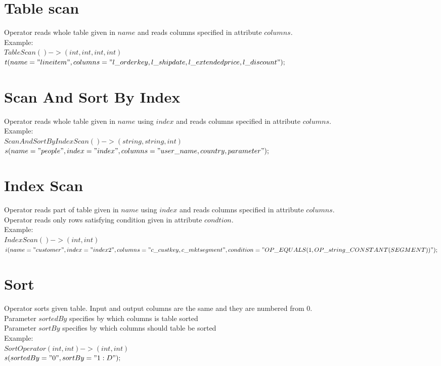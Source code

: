 \documentclass{article}
\begin{document}
\section{Table scan}
Operator reads whole table given in $name$ and reads columns specified in attribute $columns$.\\
Example:\\
$TableScan()->(int,int,int,int)$\\
$t(name="lineitem",columns="l\_orderkey,l\_shipdate,l\_extendedprice,l\_discount");$\\ 


\section{Scan And Sort By Index}
Operator reads whole table given in $name$ using $index$ and reads columns specified in attribute $columns$.\\
Example:\\
$ScanAndSortByIndexScan()->(string,string,int)$\\
$s(name="people",index="index",columns="user\_name,country,parameter"); $\\ 


\section{Index Scan}
Operator reads part of table given in $name$ using $index$ and reads columns specified in attribute $columns$.\\
Operator reads only rows satisfying condition given in attribute $condtion$.\\
Example:\\
$IndexScan()->(int,int)$\\
$i(name="customer",index="index2",columns="c\_custkey,c\_mktsegment",condition="OP\_EQUALS(1,OP\_string\_CONSTANT(SEGMENT))");$\\



\section{Sort}
Operator sorts given table.
Input and output columns are the same and they are numbered from 0.\\
Parameter $sortedBy$ specifies by which columns is table sorted\\
Parameter $sortBy$ specifies by which columns should table be sorted\\
Example:\\
$SortOperator(int,int)->(int,int)$\\
$s(sortedBy="0",sortBy="1:D");$\\
\end{document}
